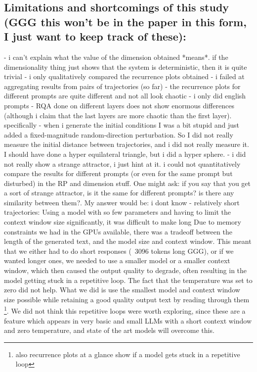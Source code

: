 \documentclass[a4paper,12pt]{article}
\begin{document}
\subsection{Limitations and shortcomings of this study (GGG this won't be in the paper in this form, I just want to keep track of these):}
\label{subsec:appendix_limitations}
\label{subsec:appendix_limitations}
- i can't explain what the value of the dimension obtained *means*. if the dimensionality thing just shows that the system is deterministic, then it is quite trivial
- i only qualitatively compared the recurrence plots obtained
- i failed at aggregating results from pairs of trajectories (so far)
- the recurrence plots for different prompts are quite different and not all look chaotic
- i only did english prompts
- RQA done on different layers does not show enormous differences (although i claim that the last layers are more chaotic than the first layer). specifically
- when i generate the initial conditions I was a bit stupid and just added a fixed-magnitude random-direction perturbation. So I did not really measure the initial distance between trajectories, and i did not really measure it. I should have done a hyper equilateral triangle, but i did a hyper sphere.
- i did not really show a strange attractor, i just hint at it. i could not quantitatively compare the results for different prompts (or even for the same prompt but disturbed) in the RP and dimension stuff. One might ask: if you say that you get a sort of strange attractor, is it the same for different prompts? is there any similarity between them?. My answer would be: i dont know
- relatively short trajectories:
Using a model with so few parameters and having to limit the context window size significantly, it was difficult to make long
Due to memory constraints we had in the GPUs available, there was a tradeoff between the length of the generated text, and the model size and context window. This meant that we either had to do short responses (~3096 tokens long GGG), or if we wanted longer ones, we needed to use a smaller model or a smaller context window, which then caused the output quality to degrade, often resulting in the model getting stuck in a repetitive loop. The fact that the temperature was set to zero did not help.
What we did is use the smallest model and context window size possible while retaining a good quality output text by reading through them \footnote{also recurrence plots at a glance show if a model gets stuck in a repetitive loop}. 
We did not think this repetitive loops were worth exploring, since these are a feature which appears in very basic and small LLMs with a short context window and zero temperature, and state of the art models will overcome this.
\end{document}
